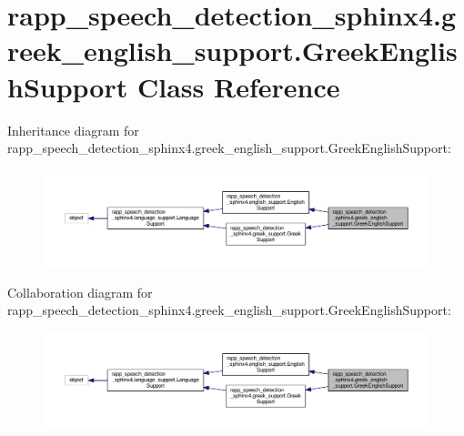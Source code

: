 \hypertarget{classrapp__speech__detection__sphinx4_1_1greek__english__support_1_1GreekEnglishSupport}{\section{rapp\-\_\-speech\-\_\-detection\-\_\-sphinx4.\-greek\-\_\-english\-\_\-support.\-Greek\-English\-Support Class Reference}
\label{classrapp__speech__detection__sphinx4_1_1greek__english__support_1_1GreekEnglishSupport}
}


Inheritance diagram for rapp\-\_\-speech\-\_\-detection\-\_\-sphinx4.\-greek\-\_\-english\-\_\-support.\-Greek\-English\-Support\-:
\nopagebreak
\begin{figure}[H]
\begin{center}
\leavevmode
\includegraphics[width=350pt]{classrapp__speech__detection__sphinx4_1_1greek__english__support_1_1GreekEnglishSupport__inherit__graph}
\end{center}
\end{figure}


Collaboration diagram for rapp\-\_\-speech\-\_\-detection\-\_\-sphinx4.\-greek\-\_\-english\-\_\-support.\-Greek\-English\-Support\-:
\nopagebreak
\begin{figure}[H]
\begin{center}
\leavevmode
\includegraphics[width=350pt]{classrapp__speech__detection__sphinx4_1_1greek__english__support_1_1GreekEnglishSupport__coll__graph}
\end{center}
\end{figure}
